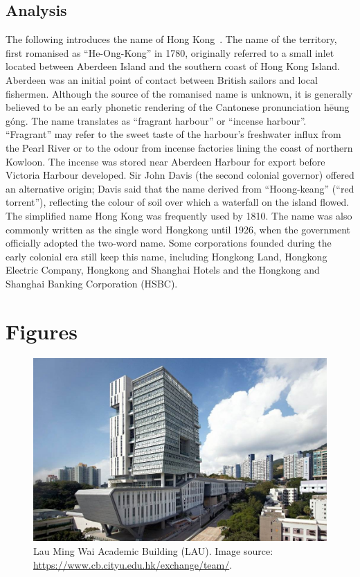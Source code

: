 \documentclass[12pt,notitlepage]{article}
\begin{document}
\subsection{Analysis}
The following introduces the name of Hong Kong~\parencite[\cref{fig:hk};][]{wiki:hk}.
The name of the territory, first romanised as ``He-Ong-Kong'' in 1780,
originally referred to a small inlet located between Aberdeen Island and the southern coast of Hong Kong Island. Aberdeen was an initial point of contact between British sailors and local fishermen.
Although the source of the romanised name is unknown,
it is generally believed to be an early phonetic rendering of the Cantonese pronunciation hēung góng. The name translates as ``fragrant harbour'' or ``incense harbour''.
``Fragrant'' may refer to the sweet taste of the harbour's freshwater influx from the Pearl River or
to the odour from incense factories lining the coast of northern Kowloon.
The incense was stored near Aberdeen Harbour for export before Victoria Harbour developed.
Sir John Davis (the second colonial governor) offered an alternative origin;
Davis said that the name derived from ``Hoong-keang'' (``red torrent''),
reflecting the colour of soil over which a waterfall on the island flowed.
The simplified name Hong Kong was frequently used by 1810.
The name was also commonly written as the single word Hongkong until 1926, when the government officially adopted the two-word name.
Some corporations founded during the early colonial era still keep this name, including Hongkong Land, Hongkong Electric Company, Hongkong and Shanghai Hotels and the Hongkong and Shanghai Banking Corporation (HSBC).
\clearpage
{}
\setcounter{page}{1}
\section{Figures}

\begin{figure}[H]
  \includegraphics[width=\linewidth]{AC3}
  \caption{Lau Ming Wai Academic Building (LAU). Image source: \url{https://www.cb.cityu.edu.hk/exchange/team/}.}
  \label{fig:ac3}
\end{figure}
\end{document}

